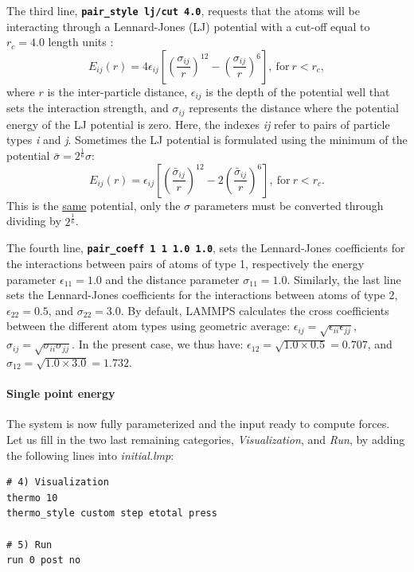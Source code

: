 \documentclass[9pt,tutorial]{livecoms}
\renewcommand{\emph}[1]{\underline{#1}}
\newcommand{\lmpcmd}[1]{\texttt{\normalsize\bfseries\textcolor{command}{#1}}}
\begin{document}
The third line, \lmpcmd{pair\_style lj/cut 4.0}, requests that the atoms
will be interacting through a Lennard-Jones (LJ) potential with a
cut-off equal to $r_c = 4.0$ length units
\cite{wang2020lennard,fischer2023history}:
$$E_{ij} (r) = 4 \epsilon_{ij} \left[ \left( \dfrac{\sigma_{ij}}{r} \right)^{12}
  - \left( \dfrac{\sigma_{ij}}{r} \right)^{6} \right], ~ \text{for} ~ r
< r_c,$$ where $r$ is the inter-particle distance, $\epsilon_{ij}$ is
the depth of the potential well that sets the interaction strength, and
$\sigma_{ij}$ represents the distance where the potential energy of the
LJ potential is zero.  Here, the indexes \textit{ij} refer to pairs of
particle types \textit{i} and \textit{j}.  Sometimes the LJ potential is
formulated using the minimum of the potential
$\bar{\sigma} = 2^{\frac{1}{6}}\sigma$:
$$E_{ij} (r) = \epsilon_{ij} \left[ \left( \dfrac{\bar{\sigma}_{ij}}{r} \right)^{12}
    - 2\left( \dfrac{\bar{\sigma}_{ij}}{r} \right)^{6} \right], ~
  \text{for} ~ r < r_c.$$
This is the \emph{same} potential, only the $\sigma$ parameters must
be converted through dividing by $2^{\frac{1}{6}}$.

The fourth line, \lmpcmd{pair\_coeff 1 1 1.0 1.0}, sets the
Lennard-Jones coefficients for the interactions between pairs of atoms
of type 1, respectively the energy parameter $\epsilon_{11} = 1.0$ and
the distance parameter $\sigma_{11} = 1.0$.  Similarly, the last line
sets the Lennard-Jones coefficients for the interactions between atoms
of type 2, $\epsilon_{22} = 0.5$, and $\sigma_{22} = 3.0$.  By default,
LAMMPS calculates the cross coefficients between the different atom
types using geometric average:
$\epsilon_{ij} = \sqrt{\epsilon_{ii} \epsilon_{jj}}$,
$\sigma_{ij} = \sqrt{\sigma_{ii} \sigma_{jj}}$.  In the present case, we
thus have: $\epsilon_{12} = \sqrt{1.0 \times 0.5} = 0.707$, and
$\sigma_{12} = \sqrt{1.0 \times 3.0} = 1.732$.

\paragraph{Single point energy}
The system is now fully parameterized and the input ready to compute
forces.  Let us fill in the two last remaining categories,
\textit{Visualization}, and \textit{Run}, by adding the following lines
into \textit{initial.lmp}:
\begin{lstlisting}
# 4) Visualization
thermo 10
thermo_style custom step etotal press

# 5) Run
run 0 post no
\end{lstlisting}
\end{document}
